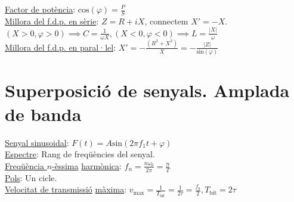 \documentclass[12pt]{article}
\begin{document}
\begin{multicols}{5}
\underline{Factor de potència}: $\text{cos}(\varphi) = \frac{P}{S}$ \\
\underline{Millora del f.d.p. en sèrie}: $Z = R + iX$, connectem $X' = -X$. $(X>0,\varphi>0) \implies C=\frac{1}{\omega X}, (X<0, \varphi<0) \implies L=\frac{\vert X\vert}{\omega}$ \\
\underline{Millora del f.d.p. en paral·lel}: $X' = -\frac{(R^2+X^2)}{X} = -\frac{\vert Z\vert}{\text{sin}(\varphi)}$

\section{Superposició de senyals. Amplada de banda}

\underline{Senyal sinusoidal}: $F(t) = A\text{sin}(2\pi f_1t+ \varphi)$ \\
\underline{Espectre}: Rang de freqüències del senyal. \\
\underline{Freqüència $n$-èssima} \underline{harmònica}: $f_n = \frac{n\omega_0}{2\pi} = \frac{n}{T}$ \\
\underline{Pols}: Un cicle. \\
\underline{Velocitat de transmissió} \underline{màxima}: $v_\text{max} = \frac{1}{T_\text{bit}} = \frac{1}{2\tau} = \frac{f_b}{2}, T_{\text{bit}} = 2 \tau$ \\
\end{multicols}
\end{document}
